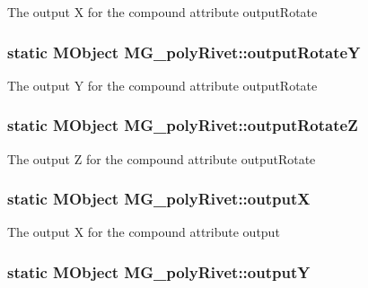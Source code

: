 The output X for the compound attribute output\-Rotate \hypertarget{class_m_g__poly_rivet_a2668b8ed6265a03068d1b9e52401330b}{
\subsubsection[{output\-Rotate\-Y}]{\setlength{\rightskip}{0pt plus 5cm}static M\-Object M\-G\-\_\-poly\-Rivet\-::output\-Rotate\-Y\hspace{0.3cm}{\ttfamily [static]}}}\label{class_m_g__poly_rivet_a2668b8ed6265a03068d1b9e52401330b}
The output Y for the compound attribute output\-Rotate \hypertarget{class_m_g__poly_rivet_aae095981ed78cd7fddae65b96b2f54fa}{
\subsubsection[{output\-Rotate\-Z}]{\setlength{\rightskip}{0pt plus 5cm}static M\-Object M\-G\-\_\-poly\-Rivet\-::output\-Rotate\-Z\hspace{0.3cm}{\ttfamily [static]}}}\label{class_m_g__poly_rivet_aae095981ed78cd7fddae65b96b2f54fa}
The output Z for the compound attribute output\-Rotate \hypertarget{class_m_g__poly_rivet_a71d0569c9b053861347de918d5c46b7b}{
\subsubsection[{output\-X}]{\setlength{\rightskip}{0pt plus 5cm}static M\-Object M\-G\-\_\-poly\-Rivet\-::output\-X\hspace{0.3cm}{\ttfamily [static]}}}\label{class_m_g__poly_rivet_a71d0569c9b053861347de918d5c46b7b}
The output X for the compound attribute output \hypertarget{class_m_g__poly_rivet_ab2fd560a86a5f12368660997fc166254}{
\subsubsection[{output\-Y}]{\setlength{\rightskip}{0pt plus 5cm}static M\-Object M\-G\-\_\-poly\-Rivet\-::output\-Y\hspace{0.3cm}{\ttfamily [static]}}}\label{class_m_g__poly_rivet_ab2fd560a86a5f12368660997fc166254}
